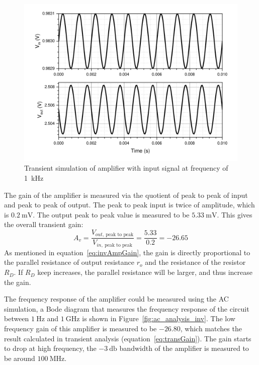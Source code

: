 \documentclass[12pt]{article}   %
\begin{document}
	\begin{figure}[htbp]
		\centering
		\includegraphics[width=0.7\linewidth]{Figures/E2_Inverting_Amplifier/Vin_Vout_1k}
		\caption{Transient simulation of amplifier with input signal at frequency of \SI{1}{\kilo\hertz}}
		\label{fig:tran1k}
	\end{figure}
	
	The gain of the amplifier is measured via the quotient of peak to peak of input and peak to peak of output. The peak to peak input is twice of amplitude, which is $\SI{0.2}{\milli\volt}$. The output peak to peak value is measured to be $\SI{5.33}{\milli\volt}$. This gives the overall transient gain:
	\begin{equation}
		A_v = \frac{V_{out,\ \text{peak to peak}}}{V_{in,\ \text{peak to peak}}} = \frac{5.33}{0.2} = -26.65
		\label{eq:transGain}
	\end{equation}
	As mentioned in equation~\eqref{eq:invAmpGain}, the gain is directly proportional to the parallel resistance of output resistance $r_o$ and the resistance of the resistor $R_D$. If $R_D$ keep increases, the parallel resistance will be larger, and thus increase the gain.
	
	The frequency response of the amplifier could be measured using the AC simulation, a Bode diagram that measures the frequency response of the circuit between $\SI{1}{\hertz}$ and $\SI{1}{\giga\hertz}$ is shown in Figure~\ref{fig:ac_analysis_inv}. The low frequency gain of this amplifier is measured to be $-26.80$, which matches the result calculated in transient analysis (equation~\eqref{eq:transGain}). The gain starts to drop at high frequency, the $\SI{-3}{\decibel}$ bandwidth of the amplifier is measured to be around $\SI{100}{\mega\hertz}$.
	
\end{document}
